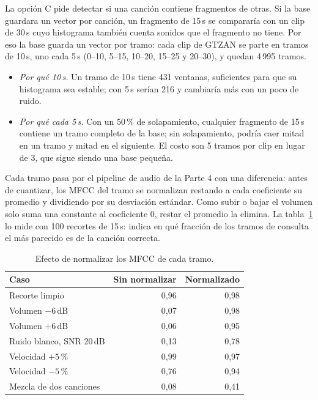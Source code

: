 \documentclass[11pt,a4paper]{article}
\begin{document}
La opción C pide detectar si una canción contiene fragmentos de otras. Si la base guardara un vector por canción, un fragmento de 15\,s se compararía con un clip de 30\,s cuyo histograma también cuenta sonidos que el fragmento no tiene. Por eso la base guarda un vector por tramo: cada clip de GTZAN se parte en tramos de 10\,s, uno cada 5\,s (0--10, 5--15, 10--20, 15--25 y 20--30), y quedan 4\,995 tramos.

\begin{itemize}
  \item \emph{Por qué 10\,s.} Un tramo de 10\,s tiene 431 ventanas, suficientes para que su histograma sea estable; con 5\,s serían 216 y cambiaría más con un poco de ruido.
  \item \emph{Por qué cada 5\,s.} Con un 50\,\% de solapamiento, cualquier fragmento de 15\,s contiene un tramo completo de la base; sin solapamiento, podría caer mitad en un tramo y mitad en el siguiente. El costo son 5 tramos por clip en lugar de 3, que sigue siendo una base pequeña.
\end{itemize}

Cada tramo pasa por el pipeline de audio de la Parte 4 con una diferencia: antes de cuantizar, los MFCC del tramo se normalizan restando a cada coeficiente su promedio y dividiendo por su desviación estándar. Como subir o bajar el volumen solo suma una constante al coeficiente 0, restar el promedio la elimina. La tabla~\ref{tab:normalizar} lo mide con 100 recortes de 15\,s: indica en qué fracción de los tramos de consulta el más parecido es de la canción correcta.

\begin{table}[H]
\centering
\small
\begin{tabular}{lrr}
\toprule
Caso & Sin normalizar & Normalizado \\
\midrule
Recorte limpio & 0,96 & 0,98 \\
Volumen $-6$\,dB & 0,07 & 0,98 \\
Volumen $+6$\,dB & 0,06 & 0,95 \\
Ruido blanco, SNR 20\,dB & 0,13 & 0,78 \\
Velocidad $+5$\,\% & 0,99 & 0,97 \\
Velocidad $-5$\,\% & 0,76 & 0,94 \\
Mezcla de dos canciones & 0,08 & 0,41 \\
\bottomrule
\end{tabular}
\caption{Efecto de normalizar los MFCC de cada tramo.}
\label{tab:normalizar}
\end{table}
\end{document}
